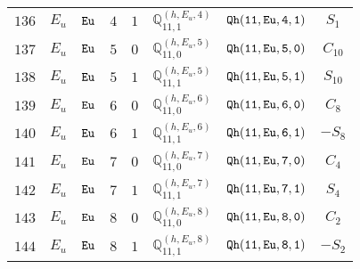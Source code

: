 \documentclass[fleqn,8pt]{jsarticle}
\begin{document}
\begin{table}[ht!]
\begin{center}
\begin{tabular}{cccccccc}
$ 136 $ & $ E_{u} $ & $ {\tt Eu} $ & $ 4 $ & $ 1 $ & $ \mathbb{Q}_{11,1}^{(h,E_{u},4)} $ & $ {\tt Qh(11,Eu,4,1)} $ & $ S_{1} $ \\
$ 137 $ & $ E_{u} $ & $ {\tt Eu} $ & $ 5 $ & $ 0 $ & $ \mathbb{Q}_{11,0}^{(h,E_{u},5)} $ & $ {\tt Qh(11,Eu,5,0)} $ & $ C_{10} $ \\
$ 138 $ & $ E_{u} $ & $ {\tt Eu} $ & $ 5 $ & $ 1 $ & $ \mathbb{Q}_{11,1}^{(h,E_{u},5)} $ & $ {\tt Qh(11,Eu,5,1)} $ & $ S_{10} $ \\
$ 139 $ & $ E_{u} $ & $ {\tt Eu} $ & $ 6 $ & $ 0 $ & $ \mathbb{Q}_{11,0}^{(h,E_{u},6)} $ & $ {\tt Qh(11,Eu,6,0)} $ & $ C_{8} $ \\
$ 140 $ & $ E_{u} $ & $ {\tt Eu} $ & $ 6 $ & $ 1 $ & $ \mathbb{Q}_{11,1}^{(h,E_{u},6)} $ & $ {\tt Qh(11,Eu,6,1)} $ & $ - S_{8} $ \\
$ 141 $ & $ E_{u} $ & $ {\tt Eu} $ & $ 7 $ & $ 0 $ & $ \mathbb{Q}_{11,0}^{(h,E_{u},7)} $ & $ {\tt Qh(11,Eu,7,0)} $ & $ C_{4} $ \\
$ 142 $ & $ E_{u} $ & $ {\tt Eu} $ & $ 7 $ & $ 1 $ & $ \mathbb{Q}_{11,1}^{(h,E_{u},7)} $ & $ {\tt Qh(11,Eu,7,1)} $ & $ S_{4} $ \\
$ 143 $ & $ E_{u} $ & $ {\tt Eu} $ & $ 8 $ & $ 0 $ & $ \mathbb{Q}_{11,0}^{(h,E_{u},8)} $ & $ {\tt Qh(11,Eu,8,0)} $ & $ C_{2} $ \\
$ 144 $ & $ E_{u} $ & $ {\tt Eu} $ & $ 8 $ & $ 1 $ & $ \mathbb{Q}_{11,1}^{(h,E_{u},8)} $ & $ {\tt Qh(11,Eu,8,1)} $ & $ - S_{2} $ \\
 \hline \hline
\end{tabular}
\end{center}
\end{table}
\end{document}
